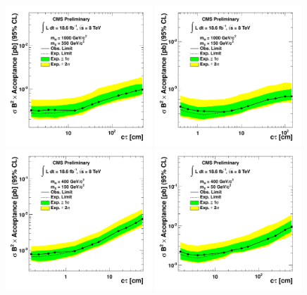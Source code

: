 \begin{figure}[htbp]
\centering
\includegraphics[width=0.49\textwidth]{plots/limits/1000_350ea.pdf}
\includegraphics[width=0.49\textwidth]{plots/limits/1000_150ea.pdf} 
\includegraphics[width=0.49\textwidth]{plots/limits/400_150ea.pdf}
\includegraphics[width=0.49\textwidth]{plots/limits/400_50ea.pdf} 

\end{figure}

